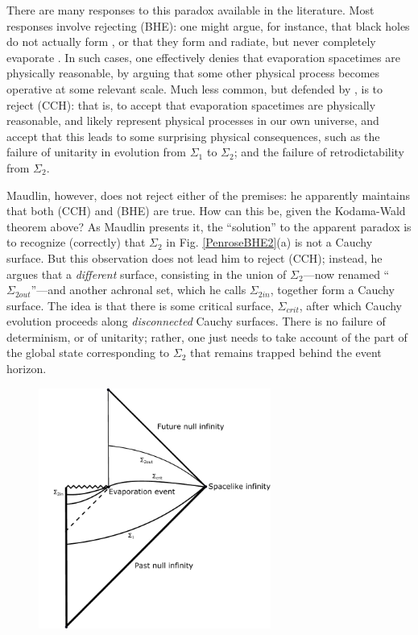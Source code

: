 \documentclass[authoryear,12pt,3p]{jowarticle}
\begin{document}
There are many responses to this paradox available in the literature.  Most responses involve rejecting (BHE): one might argue, for instance, that black holes do not actually form \citep{Fuzzball}, or that they form and radiate, but never completely evaporate \citep{EllisRemnant}.  In such cases, one effectively denies that evaporation spacetimes are physically reasonable, by arguing that some other physical process becomes operative at some relevant scale.  Much less common, but defended by \citet{Unruh+Wald}, is to reject (CCH): that is, to accept that evaporation spacetimes are physically reasonable, and likely represent physical processes in our own universe, and accept that this leads to some surprising physical consequences, such as the failure of unitarity in evolution from $\Sigma_1$ to $\Sigma_2$; and the failure of retrodictability from $\Sigma_2$.

Maudlin, however, does not reject either of the premises: he apparently maintains that both (CCH) and (BHE) are true.  How can this be, given the Kodama-Wald theorem above?  As Maudlin presents it, the ``solution'' to the apparent paradox is to recognize (correctly) that $\Sigma_2$ in Fig. \ref{PenroseBHE2}(a) is not a Cauchy surface.  But this observation does not lead him to reject (CCH); instead, he argues that a \emph{different} surface, consisting in the union of $\Sigma_2$---now renamed ``$\Sigma_{2out}$''---and another achronal set, which he calls $\Sigma_{2in}$, together form a Cauchy surface.  The idea is that there is some critical surface, $\Sigma_{crit}$, after which Cauchy evolution proceeds along \emph{disconnected} Cauchy surfaces.  There is no failure of determinism, or of unitarity; rather, one just needs to take account of the part of the global state corresponding to $\Sigma_2$ that remains trapped behind the event horizon.

\begin{figure}[h]    \centering
   \includegraphics[width=3in]{BHE_Penrose_Diagram_--_Maudlin.pdf}
   \caption{\label{MaudlinFig}}
\end{figure}
\end{document}
